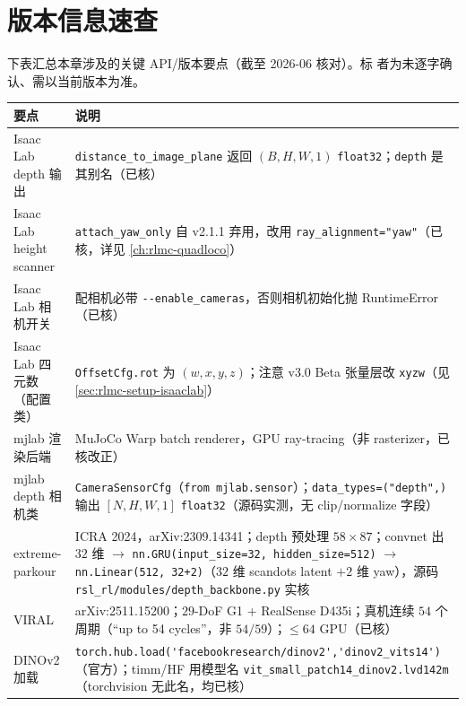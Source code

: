 \section{版本信息速查}
\label{sec:rlmc-vm-versions}

下表汇总本章涉及的关键 API/版本要点（截至 2026-06 核对）。标 \pz{} 者为未逐字确认、需以当前版本为准。

\begin{center}
\small
\begin{tabular}{@{}p{4.0cm}p{8.0cm}@{}}
\toprule
要点 & 说明 \\
\midrule
Isaac Lab depth 输出 & \verb|distance_to_image_plane| 返回 $(B,H,W,1)$ \verb|float32|；\verb|depth| 是其别名（已核） \\
Isaac Lab height scanner & \verb|attach_yaw_only| 自 v2.1.1 弃用，改用 \verb|ray_alignment="yaw"|（已核，详见 \cref{ch:rlmc-quadloco}） \\
Isaac Lab 相机开关 & 配相机必带 \verb|--enable_cameras|，否则相机初始化抛 RuntimeError（已核） \\
Isaac Lab 四元数（配置类） & \verb|OffsetCfg.rot| 为 $(w,x,y,z)$；注意 v3.0 Beta 张量层改 \verb|xyzw|（见 \cref{sec:rlmc-setup-isaaclab}） \\
mjlab 渲染后端 & MuJoCo Warp batch renderer，GPU ray-tracing（非 rasterizer，已核改正） \\
mjlab depth 相机类 & \verb|CameraSensorCfg|（\texttt{from mjlab.sensor}）；\verb|data_types=("depth",)| 输出 $[N,H,W,1]$ \verb|float32|（源码实测，无 clip/normalize 字段） \\
extreme-parkour & ICRA 2024，arXiv:2309.14341；depth 预处理 $58\times87$；convnet 出 $32$ 维 $\to$ \texttt{nn.GRU(input\_size=32, hidden\_size=512)} $\to$ \texttt{nn.Linear(512, 32+2)}（$32$ 维 scandots latent $+2$ 维 yaw），源码 \texttt{rsl\_rl/modules/depth\_backbone.py} 实核 \\
VIRAL & arXiv:2511.15200；$29$-DoF G1 + RealSense D435i；真机连续 $54$ 个周期（“up to 54 cycles”，非 $54/59$）；$\le 64$ GPU（已核） \\
DINOv2 加载 & \verb|torch.hub.load('facebookresearch/dinov2','dinov2_vits14')|（官方）；timm/HF 用模型名 \texttt{vit\_small\_patch14\_dinov2.lvd142m}（torchvision 无此名，均已核） \\
\bottomrule
\end{tabular}
\end{center}

